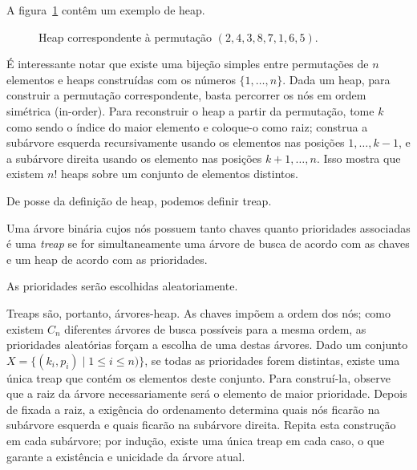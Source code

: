 A figura~\ref{fig:heap} contêm um exemplo de heap.
\begin{figure}[h]
    \centering
    \caption{Heap correspondente à permutação $(2, 4, 3, 8, 7, 1, 6, 5)$.}
    \label{fig:heap}
\end{figure}
É interessante notar que existe uma bijeção simples entre
permutações de $n$ elementos e heaps construídas com os números $\{1, \dots, n\}$.
Dada um heap, para construir a permutação correspondente,
basta percorrer os nós em ordem simétrica (in-order).
Para reconstruir o heap a partir da permutação,
tome $k$ como sendo o índice do maior elemento e coloque-o como raiz;
construa a subárvore esquerda recursivamente
usando os elementos nas posições $1, \dots, k-1$,
e a subárvore direita usando os elemento nas posições $k+1, \dots, n$.
Isso mostra que existem $n!$ heaps sobre um conjunto de elementos distintos.

De posse da definição de heap,
podemos definir treap.

\begin{definition}
    Uma árvore binária cujos nós possuem tanto chaves quanto prioridades associadas
    é uma \emph{treap}
    se for simultaneamente uma árvore de busca de acordo com as chaves
    e um heap de acordo com as prioridades.
\end{definition}

As prioridades serão escolhidas aleatoriamente.

Treaps são, portanto, árvores-heap.
As chaves impõem a ordem dos nós;
como existem $C_n$ diferentes árvores de busca possíveis para a mesma ordem,
as prioridades aleatórias forçam a escolha de uma destas árvores.
Dado um conjunto $X = \{ (k_i, p_i) \mid 1 \leq i \leq n) \}$,
se todas as prioridades forem distintas,
existe uma única treap que contém os elementos deste conjunto.
Para construí-la,
observe que a raiz da árvore necessariamente será o elemento de maior prioridade.
Depois de fixada a raiz,
a exigência do ordenamento determina quais nós ficarão na subárvore esquerda
e quais ficarão na subárvore direita.
Repita esta construção em cada subárvore;
por indução, existe uma única treap em cada caso,
o que garante a existência e unicidade da árvore atual.

